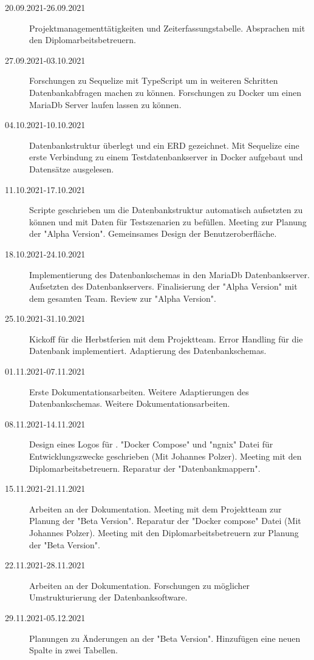 
\begin{description}
    \item[20.09.2021-26.09.2021] Projektmanagementtätigkeiten und Zeiterfassungstabelle. Absprachen mit den Diplomarbeitsbetreuern.
    \item[27.09.2021-03.10.2021] Forschungen zu Sequelize mit TypeScript um in weiteren Schritten Datenbankabfragen machen zu können. Forschungen zu Docker um einen MariaDb Server laufen lassen zu können.
    \item[04.10.2021-10.10.2021] Datenbankstruktur überlegt und ein ERD gezeichnet. Mit Sequelize eine erste Verbindung zu einem Testdatenbankserver in Docker aufgebaut und Datensätze ausgelesen.
    \item[11.10.2021-17.10.2021] Scripte geschrieben um die Datenbankstruktur automatisch aufsetzten zu können und mit Daten für Testszenarien zu befüllen. Meeting zur Planung der "Alpha Version". Gemeinsames Design der Benutzeroberfläche.
    \item[18.10.2021-24.10.2021] Implementierung des Datenbankschemas in den MariaDb Datenbankserver. Aufsetzten des Datenbankservers. Finalisierung der "Alpha Version" mit dem gesamten Team. Review zur "Alpha Version".
    \item[25.10.2021-31.10.2021] Kickoff für die Herbstferien mit dem Projektteam. Error Handling für die Datenbank implementiert. Adaptierung des Datenbankschemas.
    \item[01.11.2021-07.11.2021] Erste Dokumentationsarbeiten. Weitere Adaptierungen des Datenbankschemas. Weitere Dokumentationsarbeiten.
    \item[08.11.2021-14.11.2021] Design eines Logos für \ZELIA. "Docker Compose" und "ngnix" Datei für Entwicklungszwecke geschrieben (Mit Johannes Polzer). Meeting mit den Diplomarbeitsbetreuern. Reparatur der "Datenbankmappern". 
    \item[15.11.2021-21.11.2021] Arbeiten an der Dokumentation. Meeting mit dem Projektteam zur Planung der "Beta Version". Reparatur der "Docker compose" Datei (Mit Johannes Polzer). Meeting mit den Diplomarbeitsbetreuern zur Planung der "Beta Version".  
    \item[22.11.2021-28.11.2021] Arbeiten an der Dokumentation. Forschungen zu möglicher Umstrukturierung der Datenbanksoftware.
    \item[29.11.2021-05.12.2021] Planungen zu Änderungen an der "Beta Version". Hinzufügen eine neuen Spalte in zwei Tabellen. 

\end{description}
